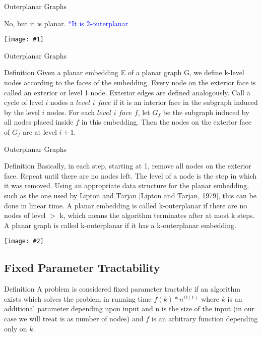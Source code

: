 \documentclass{beamer}
\newcommand{\iph}[2]{
    \texttt{[image: \#2]}
}
\newcommand{\ph}[1]{
    \texttt{[image: \#1]}
}
\begin{document}
\begin{frame}{Outerplanar Graphs}
\begin{example}
    No, but it is planar. \textcolor{blue}{*It is 2-outerplanar}

    \ph{o6}


\end{example}
\end{frame}

\begin{frame}{Outerplanar Graphs}
\begin{block}{Definition}
    Given a planar embedding E of a planar graph G, we
    define k-level nodes according to the faces of the embedding. Every node on the exterior face is called an exterior
    or level 1 node. Exterior edges are defined analogously. Call a cycle of
    level $i$ nodes a $level$ $i$ $face$ if it is an interior face in the subgraph induced by
    the level $i$ nodes. For each $level$ $i$ $face$ $f$, let $G_f$ be the subgraph induced by all
    nodes placed inside $f$ in this embedding. Then the nodes on the exterior face
    of $G_f$ are at level $i + 1$. 
\end{block}
\end{frame}


\begin{frame}{Outerplanar Graphs}
\begin{block}{Definition}
    Basically, in each
    step, starting at 1, remove all nodes on the exterior face.
    Repeat until there are no nodes left. The level of a node
    is the step in which it was removed. Using an appropriate data structure for the planar embedding, such as the
    one used by Lipton and Tarjan [Lipton and Tarjan,
    1979], this can be done in linear time.
    A planar embedding is called k-outerplanar if there are
    no nodes of level $>$ k, which means the algorithm terminates after at most k steps. A planar graph is called
    k-outerplanar if it has a k-outerplanar embedding.  
\end{block}
\end{frame}
\begin{frame}
    \begin{example}
        \iph{0.75}{o7}
    \end{example}
\end{frame}
\subsection{Fixed Parameter Tractability}
\begin{frame}
    \begin{block}{Definition}
        A problem is considered fixed parameter tractable if an algorithm exists which solves the problem in running time $f(k) * n^{O(1)}$ where $k$ is an additional parameter depending upon input and n is the size of the input (in our case we will treat is as number of nodes) and $f$ is an arbitrary function depending only on $k$.
    \end{block}

\end{frame}
\end{document}
